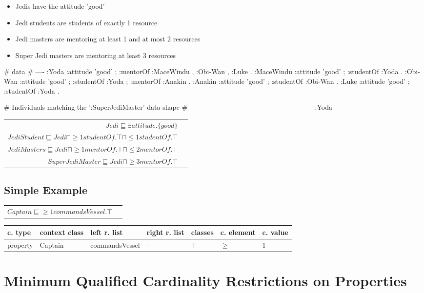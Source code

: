 \documentclass{llncs}
\newenvironment{gcotable}{
  \scriptsize
  \sffamily
  \vspace{0.3cm}
	\begin{center}
  \begin{tabular}{l|l|l|l|l|l|l}
  \hline
  \textbf{c. type} & \textbf{context class} & \textbf{left r. list} & \textbf{right r. list} & \textbf{classes} & \textbf{c. element} & \textbf{c. value} \\
  \hline

}{
  \hline
  \end{tabular}
	\end{center}
}
\newenvironment{DL}{
	\begin{center}
  \begin{tabular}{r l}

}{
  \end{tabular}
	\end{center}
}
\begin{document}
\begin{itemize}
	\item Jedis have the attitude 'good'
	\item Jedi students are students of exactly 1 resource
	\item Jedi masters are mentoring at least 1 and at most 2 resources
	\item Super Jedi masters are mentoring at least 3 resources  
\end{itemize}

\begin{ex}
# data
# ----
:Yoda 
    :attitude 'good' ;
    :mentorOf :MaceWindu , :Obi-Wan , :Luke .
:MaceWindu
    :attitude 'good' ;
    :studentOf :Yoda .
:Obi-Wan 
    :attitude 'good' ;
    :studentOf :Yoda ;
    :mentorOf :Anakin .
:Anakin
    :attitude 'good' ; 
    :studentOf :Obi-Wan .
:Luke
    :attitude 'good' ;
    :studentOf :Yoda .
\end{ex}

\begin{ex}
# Individuals matching the ’:SuperJediMaster’ data shape
# ------------------------------------------------------
:Yoda 
\end{ex}

\begin{DL}
$Jedi \sqsubseteq \exists attitude.\{good\} $\\
$JediStudent \sqsubseteq Jedi \sqcap \geq1 studentOf.\top \sqcap \leq1 studentOf.\top$ \\
$JediMasters \sqsubseteq Jedi \sqcap \geq1 mentorOf.\top \sqcap \leq2 mentorOf.\top $\\
$SuperJediMaster \sqsubseteq Jedi \sqcap  \geq3 mentorOf.\top $
\end{DL}

\subsection{Simple Example}

\begin{DL}
$Captain \sqsubseteq \geq1 commandsVessel.\top $
\end{DL}

\begin{gcotable}
property & Captain & commandsVessel & - & $\top$ & $\geq$ & 1 \\
\end{gcotable}

\section{Minimum Qualified Cardinality Restrictions on Properties}
\end{document}
